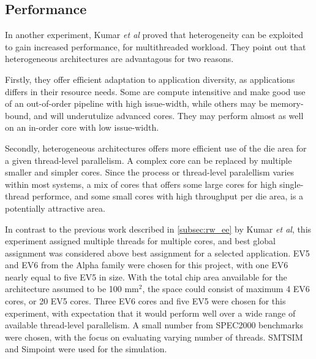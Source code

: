 \subsection{Performance}
\label{subsec:rw_perf}
In another experiment, Kumar \textit{et al}\cite{heterogeneous-perf} proved that heterogeneity can be exploited to gain increased performance, for multithreaded workload.
They point out that heterogeneous architectures are advantagous for two reasons.

Firstly, they offer efficient adaptation to application diversity, as applications differs in their resource needs.
Some are compute intensitive and make good use of an out-of-order pipeline with high issue-width, while others may be memory-bound, and will underutulize advanced cores.
They may perform almost as well on an in-order core with low issue-width\cite{heterogeneous-perf}.

Secondly, heterogeneous architectures offers more efficient use of the die area for a given thread-level parallelism.
A complex core can be replaced by multiple smaller and simpler cores. 
Since the process or thread-level paralellism varies within most systems, a mix of cores that offers some large cores for high single-thread performce, and some small cores with high throughput per die area, is a potentially attractive area. \cite{heterogeneous-perf}

In contrast to the previous work described in \ref{subsec:rw_ee} by Kumar \textit{et al}, this experiment assigned multiple threads for multiple cores, and best global assignment was considered above best assignment for a selected application.
EV5 and EV6 from the Alpha family were chosen for this project, with one EV6 nearly equal to five EV5 in size.
With the total chip area anvailable for the architecture assumed to be 100 mm$^2$, the space could consist of maximum 4 EV6 cores, or 20 EV5 cores.
Three EV6 cores and five EV5 were chosen for this experiment, with expectation that it would perform well over a wide range of available thread-level parallelism. 
A small number from SPEC2000 benchmarks were chosen, with the focus on evaluating varying number of threads.
SMTSIM and Simpoint were used for the simulation.



